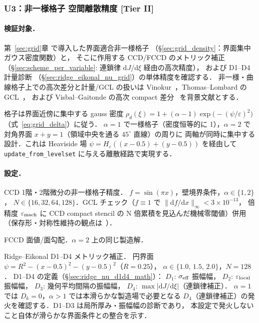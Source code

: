 %
\subsubsection{U3：非一様格子 空間離散精度 [Tier II]}
\label{sec:U3_nonuniform_suite}

\paragraph{検証対象．}
第~\ref{sec:grid}章 で導入した界面適合非一様格子
（§\ref{sec:grid_density}：界面集中ガウス密度関数）と，
そこに作用する CCD/FCCD のメトリック補正
（§\ref{sec:scheme_per_variable}: 連鎖律 $\mathrm{d}J/\mathrm{d}\xi$ 経由の高次精度），
および D1--D4 計量診断
（§\ref{sec:ridge_eikonal_nu_grid}）の単体精度を確認する．
非一様・曲線格子上での高次差分と計量/GCL の扱いは
Vinokur~\cite{Vinokur1983}，Thomas--Lombard の GCL~\cite{ThomasLombard1979}，
および Visbal--Gaitonde の高次 compact 差分~\cite{VisbalGaitonde2002}
を背景文献とする．

格子は界面近傍に集中する gauss 密度
$\rho_d(\xi) = 1 + (\alpha-1)\exp\!\bigl(-(\psi/\varepsilon)^2\bigr)$
（式~\eqref{eq:grid_delta}）に従う．
$\alpha = 1$ で一様格子（密度恒等的に 1），$\alpha = 2$ で
対角界面 $x + y = 1$（領域中央を通る $45^\circ$ 直線）の周りに
両軸が同時に集中する設計．これは Heaviside 場 $\psi = H_{\varepsilon}((x-0.5)+(y-0.5))$ を経由して
\texttt{update\_from\_levelset} に与える離散経路で実現する．

\paragraph{設定．}
\begin{description}\setlength{\itemsep}{0pt}
  \item[U3-a] CCD 1階・2階微分の非一様格子精度．
        $f = \sin(\pi x)$，壁境界条件，$\alpha \in \{1, 2\}$，
        $N \in \{16, 32, 64, 128\}$．GCL チェック（$f \equiv 1$ で
        $\|\mathrm{d}f / \mathrm{d}x\|_\infty < 3\times 10^{-13}$，
        倍精度 $\varepsilon_{\mathrm{mach}}$ に CCD compact stencil の N 倍累積を見込んだ機械零閾値）併用
        （保存形・対称性維持の観点は~\cite{VerstappenVeldman2003}）．
  \item[U3-b] FCCD 面値/面勾配．$\alpha = 2$ 上の同じ製造解．
  \item[U3-c] Ridge--Eikonal D1--D4 メトリック補正．
        円界面 $\psi = R^2 - (x-0.5)^2 - (y-0.5)^2$（$R = 0.25$），
        $\alpha \in \{1.0,\, 1.5,\, 2.0\}$，$N = 128$．
        D1--D4 の定義（§\ref{sec:ridge_nu_d1d4_math}）：
        \quad $D_1$: $\sigma_{\mathrm{eff}}$ 振幅幅，
        \quad $D_2$: $\varepsilon_{\mathrm{local}}$ 振幅幅，
        \quad $D_3$: 幾何平均間隔の振幅幅，
        \quad $D_4$: $\max|\mathrm{d}J/\mathrm{d}\xi|$（連鎖律補正）．
        $\alpha = 1$ では $D_k = 0$，$\alpha > 1$ では本滑らかな製造場で必要となる
        $D_4$（連鎖律補正）の発火を確認する．D1--D3 は局所厚み・振幅幅の診断であり，
        本設定で発火しないこと自体が滑らかな界面条件との整合を示す．
\end{description}

